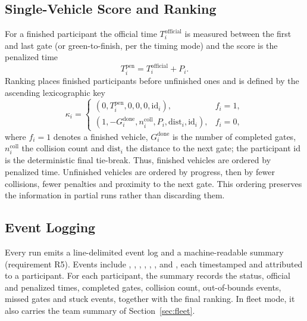 \subsection{Single-Vehicle Score and Ranking}

For a finished participant the official time $T_i^{\mathrm{official}}$ is measured between the first and last gate (or green-to-finish, per the timing mode) and the score is the penalized time
\begin{equation}
\label{eq:penalized}
T_i^{\mathrm{pen}}=T_i^{\mathrm{official}}+P_i .
\end{equation}
Ranking places finished participants before unfinished ones and is defined by the ascending lexicographic key
\begin{equation}
\label{eq:ranking}
\kappa_i=\begin{cases}
(0,T_i^{\mathrm{pen}},0,0,0,\mathrm{id}_i), & f_i=1,\\
(1,-G_i^{\mathrm{done}},n_i^{\mathrm{coll}},P_i,\mathrm{dist}_i,\mathrm{id}_i), & f_i=0,
\end{cases}
\end{equation}
where $f_i=1$ denotes a finished vehicle, $G_i^{\mathrm{done}}$ is the number of completed gates, $n_i^{\mathrm{coll}}$ the collision count and $\mathrm{dist}_i$ the distance to the next gate; the participant id is the deterministic final tie-break. Thus, finished vehicles are ordered by penalized time. Unfinished vehicles are ordered by progress, then by fewer collisions, fewer penalties and proximity to the next gate. This ordering preserves the information in partial runs rather than discarding them.

\subsection{Event Logging}

Every run emits a line-delimited event log and a machine-readable summary (requirement R5). Events include , , , , , ,  and , each timestamped and attributed to a participant. For each participant, the summary records the status, official and penalized times, completed gates, collision count, out-of-bounds events, missed gates and stuck events, together with the final ranking. In fleet mode, it also carries the team summary of Section~\ref{sec:fleet}.
